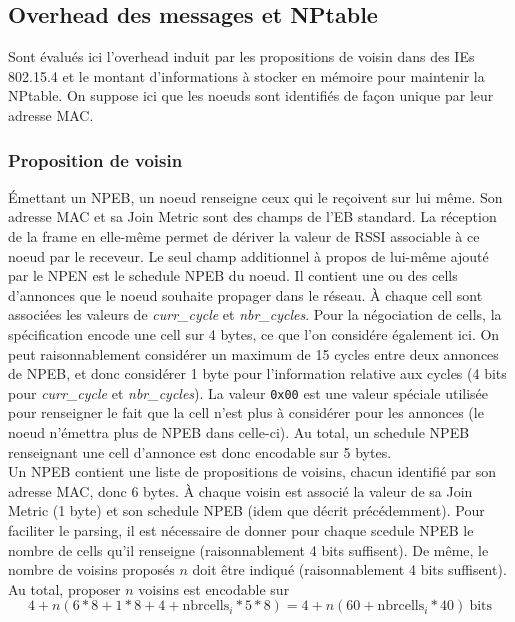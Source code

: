 \documentclass[]{report}
\begin{document}
\subsection{Overhead des messages et NPtable}

Sont évalués ici l'overhead induit par les propositions de voisin dans des IEs 802.15.4 et le montant d'informations à stocker en mémoire pour maintenir la NPtable. On suppose ici que les noeuds sont identifiés de façon unique par leur adresse MAC.

\subsubsection{Proposition de voisin}
\label{size_prop}

Émettant un NPEB, un noeud renseigne ceux qui le reçoivent sur lui même. Son adresse MAC et sa Join Metric sont des champs de l'EB standard. La réception de la frame en elle-même permet de dériver la valeur de RSSI associable à ce noeud par le receveur. Le seul champ additionnel à propos de lui-même ajouté par le NPEN est le schedule NPEB du noeud. Il contient une ou des cells d'annonces que le noeud souhaite propager dans le réseau. À chaque cell sont associées les valeurs de \textit{curr\_cycle} et \textit{nbr\_cycles}. Pour la négociation de cells, la spécification \cite{rfc8480} encode une cell sur 4 bytes, ce que l'on considére également ici. On peut raisonnablement considérer un maximum de 15 cycles entre deux annonces de NPEB, et donc considérer 1 byte pour l'information relative aux cycles (4 bits pour \textit{curr\_cycle} et \textit{nbr\_cycles}). La valeur \texttt{0x00} est une valeur spéciale utilisée pour renseigner le fait que la cell n'est plus à considérer pour les annonces (le noeud n'émettra plus de NPEB dans celle-ci). Au total, un schedule NPEB renseignant une cell d'annonce est donc encodable sur 5 bytes.\\

Un NPEB contient une liste de propositions de voisins, chacun identifié par son adresse MAC, donc 6 bytes. À chaque voisin est associé la valeur de sa Join Metric (1 byte) et son schedule NPEB (idem que décrit précédemment). Pour faciliter le parsing, il est nécessaire de donner pour chaque scedule NPEB le nombre de cells qu'il renseigne (raisonnablement 4 bits suffisent). De même, le nombre de voisins proposés $n$ doit être indiqué (raisonnablement 4 bits suffisent). Au total, proposer $n$ voisins est encodable sur
 \[ 4+n (6*8 + 1*8 + 4 + \text{nbrcells}_{i}*5*8) 
 = 4 + n(60+\text{nbrcells}_{i}*40)\ \text{bits} \]
 
\end{document}
